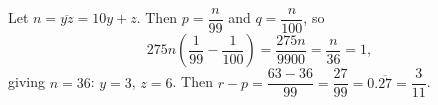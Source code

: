 Let $n=\overline{yz}=10y+z$. Then $p=\dfrac{n}{99}$ and $q=\dfrac{n}{100}$, so
\[
275n\left(\dfrac{1}{99}-\dfrac{1}{100}\right)=\dfrac{275n}{9900}=\dfrac{n}{36}=1,
\]
giving $n=36$: $y=3$, $z=6$. Then $r-p=\dfrac{63-36}{99}=\dfrac{27}{99}=\boxed{0.\overline{27}}=\dfrac{3}{11}$.

